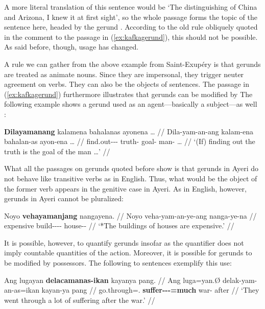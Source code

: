 A more literal translation of this sentence would be `The distinguishing of 
China and Arizona, I knew it at first sight', so the whole passage 
 forms the topic of the 
sentence here, headed by the gerund 
. According to the old rule 
obliquely quoted in the comment to the passage in (\ref{ex:kafkagerund}), this 
should not be possible. As said before, though, usage has changed.

A rule we can gather from the above example from Saint-Exupéry is that gerunds 
are treated as animate nouns. Since they are impersonal, they trigger neuter 
agreement on verbs. They can also be the objects of sentences. The passage in 
(\ref{ex:kafkagerund}) furthermore illustrates that gerunds can be modified by 
The following example shows a gerund used as an agent---basically a 
subject---as well \citep{benung:scientificmethod}:

\ex\label{ex:scimethgerund}\begingl
	\gla \textbf{Dilayamanang} kalamena bahalanas ayonena … //
	\glb Dila-yam-an-ang kalam-ena bahalan-as ayon-ena … //
	\glc find.out-\Ptcp{}-\Nmlz{}-\Aarg{} truth-\Gen{} goal-\Parg{} 
		man-\Gen{} … //
	\glft `(If) finding out the truth is the goal of the man …' //
\endgl\xe

What all the passages on gerunds quoted before show is that gerunds in Ayeri 
do not behave like transitive verbs as in English. Thus, what would be the 
object of the former verb appears in the genitive case in Ayeri. As in English, 
however, gerunds in Ayeri cannot be pluralized:

\ex\ljudge* \begingl
	\gla Noyo \textbf{vehayamanjang} nangayena. //
	\glb Noyo veha-yam-an-ye-ang nanga-ye-na //
	\glc expensive build-\Ptcp{}-\Nmlz{}-\Pl{}-\Aarg{} house-\Pl{}-\Gen{} //
	\glft `*The buildings of houses are expensive.' //
\endgl\xe

It is possible, however, to quantify gerunds insofar as the quantifier does not 
imply countable quantities of the action. Moreover, it is possible for gerunds 
to be modified by possessors. The following to sentences exemplify this use:

\ex\begingl
	\gla Ang lugayan \textbf{delacamanas-ikan} kayanya pang. //
	\glb Ang luga=yan.Ø delak-yam-an-as=ikan kayan-ya pang //
	\glc \AgtT{} go.through=\TplM{}.\Top{} 
		\textbf{suffer-\Ptcp{}-\Nmlz{}-\Parg{}=much} war-\Loc{} after //
	\glft `They went through a lot of suffering after the war.' //
\endgl\xe

